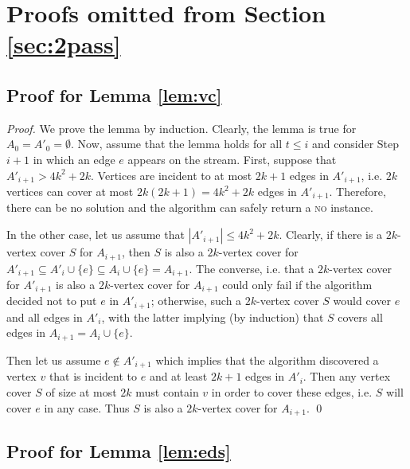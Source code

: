 \documentclass[draft,a4paper]{llncs}
\newcommand{\no}{\textsc{no}\xspace}
\begin{document}
\section{Proofs omitted from Section \ref{sec:2pass}}

\subsection{Proof for Lemma \ref{lem:vc}}

\begin{proof}
 We prove the lemma by induction. Clearly, the lemma is true for $A_0 = A'_0 = \emptyset$. Now, assume that the lemma holds for all $t \leq i$ and consider Step $i+1$ in which an edge $e$ appears on the stream. First, suppose that $A'_{i+1} > 4k^2+2k$. Vertices are incident to at most $2k+1$ edges in $A'_{i+1}$, i.e. $2k$ vertices can cover at most $2k(2k+1) = 4k^2+2k$ edges in $A'_{i+1}$. Therefore, there can be no solution and the algorithm can safely return a \no instance. 
 
 In the other case, let us assume that $|A'_{i+1}| \leq 4k^2+2k$. Clearly, if there is a $2k$-vertex cover $S$ for $A_{i+1}$, then $S$ is also a $2k$-vertex cover for $A'_{i+1} \subseteq A'_i \cup \{e\} \subseteq A_i \cup \{e\} = A_{i+1}$. 
 The converse, i.e. that a $2k$-vertex cover for $A'_{i+1}$ is also a $2k$-vertex cover for $A_{i+1}$ could
 only fail if the algorithm decided not to put $e$ in $A'_{i+1}$; otherwise, such a $2k$-vertex cover $S$ would cover $e$ and all edges in $A'_i$, with the latter implying (by induction) that $S$ covers all edges in $A_{i+1} = A_i \cup \{e\}$.
 
 Then let us assume $e \notin A'_{i+1}$ which implies that the algorithm discovered a vertex $v$ that is incident to $e$ and at
 least $2k+1$ edges in $A'_i$. Then any vertex cover $S$ of size at most $2k$ must contain $v$ in order to cover these edges, i.e.
 $S$ will cover $e$ in any case. Thus $S$ is also a $2k$-vertex cover for $A_{i+1}$. \qed \end{proof}
 
\subsection{Proof for Lemma \ref{lem:eds}}
\end{document}
